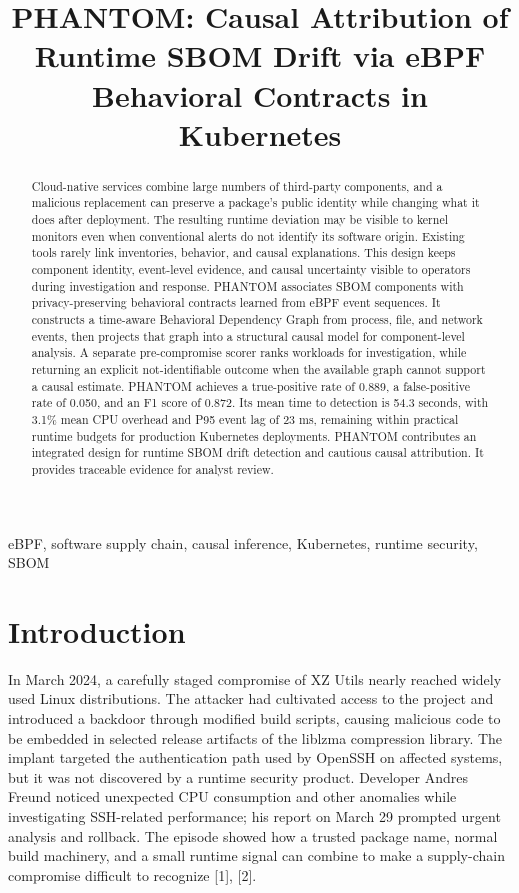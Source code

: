 \documentclass[conference]{IEEEtran}
\title{PHANTOM: Causal Attribution of Runtime SBOM Drift via eBPF Behavioral Contracts in Kubernetes}
\author{\IEEEauthorblockN{Anonymous Author(s)}\IEEEauthorblockA{Anonymous Institution}}
\begin{document}
\maketitle
\begin{abstract}
Cloud-native services combine large numbers of third-party components, and a malicious replacement can preserve a package's public identity while changing what it does after deployment. The resulting runtime deviation may be visible to kernel monitors even when conventional alerts do not identify its software origin. Existing tools rarely link inventories, behavior, and causal explanations. This design keeps component identity, event-level evidence, and causal uncertainty visible to operators during investigation and response. PHANTOM associates SBOM components with privacy-preserving behavioral contracts learned from eBPF event sequences. It constructs a time-aware Behavioral Dependency Graph from process, file, and network events, then projects that graph into a structural causal model for component-level analysis. A separate pre-compromise scorer ranks workloads for investigation, while returning an explicit not-identifiable outcome when the available graph cannot support a causal estimate. PHANTOM achieves a true-positive rate of 0.889, a false-positive rate of 0.050, and an F1 score of 0.872. Its mean time to detection is 54.3 seconds, with 3.1\% mean CPU overhead and P95 event lag of 23 ms, remaining within practical runtime budgets for production Kubernetes deployments. PHANTOM contributes an integrated design for runtime SBOM drift detection and cautious causal attribution. It provides traceable evidence for analyst review.
\end{abstract}
\begin{IEEEkeywords}eBPF, software supply chain, causal inference, Kubernetes, runtime security, SBOM\end{IEEEkeywords}
\section{Introduction}
In March 2024, a carefully staged compromise of XZ Utils nearly reached widely used Linux distributions. The attacker had cultivated access to the project and introduced a backdoor through modified build scripts, causing malicious code to be embedded in selected release artifacts of the liblzma compression library. The implant targeted the authentication path used by OpenSSH on affected systems, but it was not discovered by a runtime security product. Developer Andres Freund noticed unexpected CPU consumption and other anomalies while investigating SSH-related performance; his report on March 29 prompted urgent analysis and rollback. The episode showed how a trusted package name, normal build machinery, and a small runtime signal can combine to make a supply-chain compromise difficult to recognize [1], [2].
\end{document}
